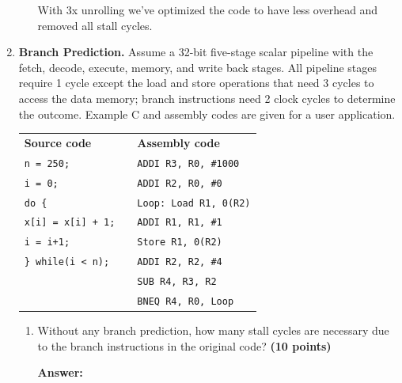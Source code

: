 \documentclass[a4paper, 11pt]{exam}
\begin{document}
\begin{enumerate}
\begin{enumerate}
With 3x unrolling we've optimized the code to have less overhead and removed all stall cycles.

\end{enumerate}

\item \textbf{Branch Prediction.}
Assume a 32-bit five-stage scalar pipeline with the fetch, decode, execute, memory, and write back stages.
All pipeline stages require 1 cycle except the load and store operations that need 3 cycles to access the data memory; branch instructions need 2 clock cycles to determine the outcome.
Example C and assembly codes are given for a user application.

\begin{tabular}{lll}
	\textbf{Source code} & & \textbf{Assembly code }\\
	\texttt{n = 250;}&  &\hspace{40pt}\texttt{ADDI R3, R0, \#1000} \\
	\texttt{i = 0;} &  &\hspace{40pt}\texttt{ADDI R2, R0, \#0}\\
	\texttt{do \{} &  &\texttt{Loop: Load  R1, 0(R2)} \\
	\hspace{20pt}\texttt{x[i] = x[i] + 1;}&  &\hspace{40pt}\texttt{ADDI   R1, R1, \#1}\\
	\hspace{20pt}\texttt{i = i+1;}&  &\hspace{40pt}\texttt{Store  R1, 0(R2)}\\
	\texttt{\} while(i < n);}&  &\hspace{40pt}\texttt{ADDI R2, R2, \#4}\\
	&  &\hspace{40pt}\texttt{SUB R4, R3, R2}\\
	&  &\hspace{40pt}\texttt{BNEQ R4, R0, Loop}\\
\end{tabular}

\begin{enumerate}
	\item  Without any branch prediction, how many stall cycles are necessary due to the branch instructions in the original code? \textbf {(10 points)}
	
\hfill
 
\textbf{Answer:} 


\end{enumerate}
\end{enumerate}
\end{document}
